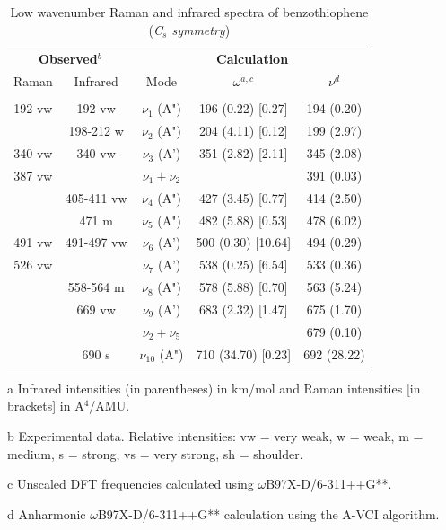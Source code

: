 	\begin{table}[H]
		\begin{center}
			\caption[Low wavenumber Raman and infrared spectra of benzothiophene]{Low wavenumber Raman and infrared spectra of benzothiophene (\textit{C$_s$ symmetry})}
			\begin{threeparttable}[b]
				\begin{tabular}{c c c c c}
					\toprule
					\multicolumn{2}{p{5cm}}{\centering \textbf{Observed$^{b}$}} & \multicolumn{3}{p{10cm}}{\centering \textbf{Calculation}} \\
					Raman & Infrared & Mode & $\omega^{a,c}$ & $\nu^{d}$ \\
					\midrule
					&  &   &    &   \\
					192 vw & 192 vw & $\nu_{1}$ (A") & 196 (0.22) [0.27] & 194 (0.20)\\
					& 198-212 w & $\nu_{2}$ (A") & 204 (4.11) [0.12] & 199 (2.97) \\
					340 vw & 340 vw & $\nu_{3}$ (A') & 351 (2.82) [2.11] & 345 (2.08) \\
					387 vw &   & $\nu_{1} + \nu_{2}$ &  & 391 (0.03) \\
					& 405-411 vw & $\nu_{4}$ (A") & 427 (3.45) [0.77] & 414 (2.50)\\
					& 471 m & $\nu_{5}$ (A") & 482 (5.88) [0.53] & 478 (6.02) \\
					491 vw & 491-497 vw & $\nu_{6}$ (A') & 500 (0.30) [10.64] & 494 (0.29) \\
					526 vw &  & $\nu_{7}$ (A') & 538 (0.25) [6.54] & 533 (0.36) \\
					& 558-564 m & $\nu_{8}$ (A") & 578 (5.88) [0.70] & 563 (5.24)\\
					& 669 vw & $\nu_{9}$ (A') & 683 (2.32) [1.47] & 675 (1.70)\\
					&  & $\nu_{2} + \nu_{5}$ &  & 679 (0.10) \\
					& 690 s & $\nu_{10}$ (A") & 710 (34.70) [0.23] & 692 (28.22)\\
					\bottomrule 
				\end{tabular}
				
				\begin{tablenotes}
					\item[a] Infrared intensities (in parentheses) in km/mol and Raman intensities [in brackets] in A$^{4}$/AMU.
					\item[b] Experimental data. Relative intensities: vw = very weak, w = weak, m = medium, s = strong, vs = very strong, sh = shoulder.
					\item[c] Unscaled DFT frequencies calculated using $\omega$B97X-D/6-311++G**.
					\item[d] Anharmonic $\omega$B97X-D/6-311++G** calculation using the A-VCI algorithm\cite{garnier2016adaptive}.
				\end{tablenotes}
			\end{threeparttable}
		\end{center}
	\end{table}
	
